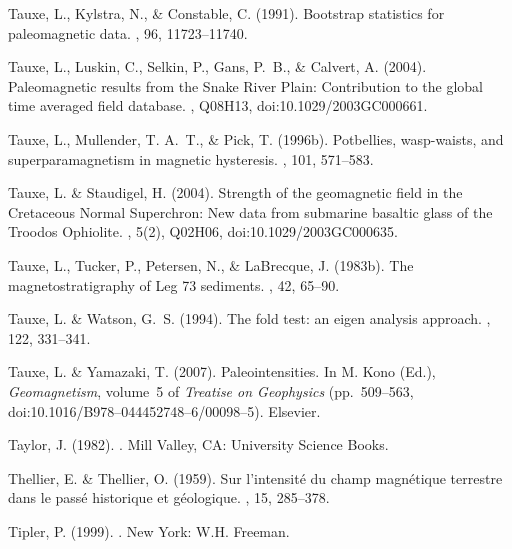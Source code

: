 Tauxe, L., Kylstra, N., \& Constable, C. (1991).
\newblock Bootstrap statistics for paleomagnetic data.
, 96, 11723--11740.

Tauxe, L., Luskin, C., Selkin, P., Gans, P.~B., \& Calvert, A. (2004).
\newblock Paleomagnetic results from the Snake River Plain: Contribution to the
  global time averaged field database.
, Q08H13, doi:10.1029/2003GC000661.

Tauxe, L., Mullender, T. A.~T., \& Pick, T. (1996b).
\newblock Potbellies, wasp-waists, and superparamagnetism in magnetic
  hysteresis.
, 101, 571--583.

Tauxe, L. \& Staudigel, H. (2004).
\newblock Strength of the geomagnetic field in the Cretaceous Normal
  Superchron: New data from submarine basaltic glass of the Troodos Ophiolite.
, 5(2), Q02H06,
  doi:10.1029/2003GC000635.

Tauxe, L., Tucker, P., Petersen, N., \& LaBrecque, J. (1983b).
\newblock The magnetostratigraphy of Leg 73 sediments.
, 42, 65--90.

Tauxe, L. \& Watson, G.~S. (1994).
\newblock The fold test: an eigen analysis approach.
, 122, 331--341.

Tauxe, L. \& Yamazaki, T. (2007).
\newblock Paleointensities.
\newblock In M. Kono (Ed.), {\em Geomagnetism}, volume~5 of {\em Treatise on
  Geophysics}  (pp.\ 509--563, doi:10.1016/B978--044452748--6/00098--5).
  Elsevier.

Taylor, J. (1982).
.
\newblock Mill Valley, CA: University Science Books.

Thellier, E. \& Thellier, O. (1959).
\newblock Sur l'intensit\' e du champ magn\' etique terrestre dans le pass\' e
  historique et g\' eologique.
, 15, 285--378.

Tipler, P. (1999).
.
\newblock New York: W.H. Freeman.

